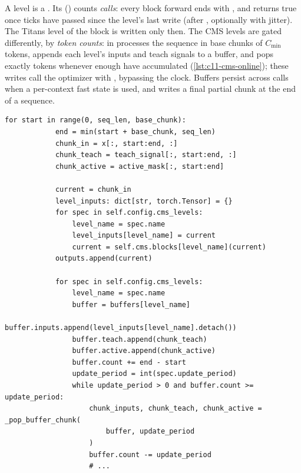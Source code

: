 \begin{implnote}[title={In the code: two cadence mechanisms}]
A level is a . Its
 () counts \emph{calls}: every block forward ends with
, and  returns true once  ticks
have passed since the level's last write (after , optionally with jitter). The
Titans level of the  block is written only then. The CMS levels are gated differently, by \emph{token
counts}:  in  processes the sequence in base chunks
of $C_{\min}$ tokens, appends each level's inputs and teach signals to a buffer, and pops exactly
 tokens whenever enough have accumulated (\cref{lst:c11-cms-online}); these
writes call the optimizer with , bypassing the clock. Buffers persist across
calls when a per-context fast state is used, and  writes a final
partial chunk at the end of a sequence.
\end{implnote}

\begin{lstlisting}[caption={Excerpt from \texttt{repos/\allowbreak kmccleary3301\_\_nested\_learning/\allowbreak src/\allowbreak nested\_learning/\allowbreak hope/\allowbreak block.py} (\texttt{HOPEAttentionBlock.\_cms\_forward\_online}): read every base chunk, write each level when its buffer holds \texttt{update\_period} tokens},label={lst:c11-cms-online}]
        for start in range(0, seq_len, base_chunk):
            end = min(start + base_chunk, seq_len)
            chunk_in = x[:, start:end, :]
            chunk_teach = teach_signal[:, start:end, :]
            chunk_active = active_mask[:, start:end]

            current = chunk_in
            level_inputs: dict[str, torch.Tensor] = {}
            for spec in self.config.cms_levels:
                level_name = spec.name
                level_inputs[level_name] = current
                current = self.cms.blocks[level_name](current)
            outputs.append(current)

            for spec in self.config.cms_levels:
                level_name = spec.name
                buffer = buffers[level_name]
                buffer.inputs.append(level_inputs[level_name].detach())
                buffer.teach.append(chunk_teach)
                buffer.active.append(chunk_active)
                buffer.count += end - start
                update_period = int(spec.update_period)
                while update_period > 0 and buffer.count >= update_period:
                    chunk_inputs, chunk_teach, chunk_active = _pop_buffer_chunk(
                        buffer, update_period
                    )
                    buffer.count -= update_period
                    # ...
\end{lstlisting}

